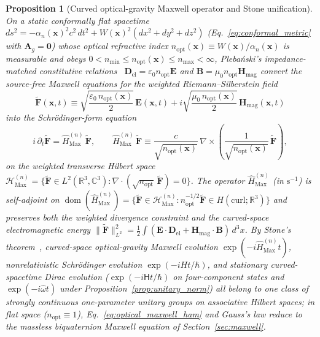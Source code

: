 \documentclass[aps,prd,onecolumn,tightenlines,nofootinbib,notitlepage,11pt,floatfix]{revtex4-2}
\theoremstyle{indentedtheorem}
\newtheorem{proposition}{Proposition}
\begin{document}

\begin{proposition}[Curved optical-gravity Maxwell operator and Stone unification]
\label{prop:stone_unification}
On a static conformally flat spacetime $ds^2 = -\alpha_n(\mathbf{x})^2c^2\,dt^2 + W(\mathbf{x})^2(dx^2+dy^2+dz^2)$ (Eq.~\eqref{eq:conformal_metric} with $\mathbf{A}_g=\mathbf{0}$) whose optical refractive index $n_\text{opt}(\mathbf{x})\equiv W(\mathbf{x})/\alpha_n(\mathbf{x})$ is measurable and obeys $0<n_{\min}\le n_\text{opt}(\mathbf{x})\le n_{\max}<\infty$, Pleba\'nski's impedance-matched constitutive relations~\citep{Plebanski1960Electromagnetic} $\mathbf{D}_\text{el}=\varepsilon_0 n_\text{opt}\mathbf{E}$ and $\mathbf{B}=\mu_0 n_\text{opt}\mathbf{H}_\text{mag}$ convert the source-free Maxwell equations for the weighted Riemann--Silberstein field~\citep{BialynickiBirula1996Photon}
\begin{equation}
    \tilde{\mathbf{F}}(\mathbf{x},t) \equiv \sqrt{\frac{\varepsilon_0\,n_\text{opt}(\mathbf{x})}{2}}\,\mathbf{E}(\mathbf{x},t) + i\sqrt{\frac{\mu_0\,n_\text{opt}(\mathbf{x})}{2}}\,\mathbf{H}_\text{mag}(\mathbf{x},t)
    \label{eq:rs_vector}
\end{equation}
into the Schr\"odinger-form equation
\begin{equation}
    i\,\partial_t\tilde{\mathbf{F}} = \hat{H}_\text{Max}^{(n)}\,\tilde{\mathbf{F}}, \qquad
    \hat{H}_\text{Max}^{(n)}\,\tilde{\mathbf{F}} \equiv \frac{c}{\sqrt{n_\text{opt}(\mathbf{x})}}\,\nabla\times\!\left(\frac{1}{\sqrt{n_\text{opt}(\mathbf{x})}}\,\tilde{\mathbf{F}}\right) ,
    \label{eq:optical_maxwell_ham}
\end{equation}
on the weighted transverse Hilbert space $\mathcal{H}_\text{Max}^{(n)} = \{\tilde{\mathbf{F}}\in L^2(\mathbb{R}^3,\mathbb{C}^3) : \nabla\cdot(\sqrt{n_\text{opt}}\,\tilde{\mathbf{F}})=0\}$. The operator $\hat{H}_\text{Max}^{(n)}$ (in $\text{s}^{-1}$) is self-adjoint on $\operatorname{dom}(\hat{H}_\text{Max}^{(n)}) = \{\tilde{\mathbf{F}}\in\mathcal{H}_\text{Max}^{(n)} : n_\text{opt}^{-1/2}\tilde{\mathbf{F}}\in H(\mathrm{curl};\mathbb{R}^3)\}$ and preserves both the weighted divergence constraint and the curved-space electromagnetic energy $\|\tilde{\mathbf{F}}\|_{L^2}^2 = \tfrac{1}{2}\int(\mathbf{E}\cdot\mathbf{D}_\text{el}+\mathbf{H}_\text{mag}\cdot\mathbf{B})\,d^3x$. By Stone's theorem~\citep{Stone1932}, curved-space optical-gravity Maxwell evolution $\exp(-i\hat{H}_\text{Max}^{(n)}t)$, nonrelativistic Schr\"odinger evolution $\exp(-iHt/\hbar)$, and stationary curved-spacetime Dirac evolution ($\exp(-i\mathsf{H}t/\hbar)$ on four-component states and $\exp(-i\hat{\omega}t)$ under Proposition~\ref{prop:unitary_norm}) all belong to one class of strongly continuous one-parameter unitary groups on associative Hilbert spaces; in flat space ($n_\text{opt}\equiv 1$), Eq.~\eqref{eq:optical_maxwell_ham} and Gauss's law reduce to the massless biquaternion Maxwell equation of Section~\ref{sec:maxwell}.

\end{proposition}
\end{document}
